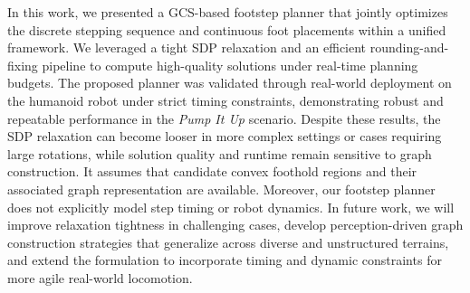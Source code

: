 \documentclass[letterpaper, 10 pt, journal, twoside]{IEEEtran}
\begin{document}
In this work, we presented a GCS-based footstep planner that jointly optimizes the discrete stepping sequence and continuous foot placements within a unified framework.
We leveraged a tight SDP relaxation and an efficient rounding-and-fixing pipeline to compute high-quality solutions under real-time planning budgets.
The proposed planner was validated through real-world deployment on the humanoid robot under strict timing constraints, demonstrating robust and repeatable performance in the \textit{Pump It Up} scenario.
Despite these results, the SDP relaxation can become looser in more complex settings or cases requiring large rotations, while solution quality and runtime remain sensitive to graph construction.
It assumes that candidate convex foothold regions and their associated graph representation are available. 
Moreover, our footstep planner does not explicitly model step timing or robot dynamics. 
In future work, we will improve relaxation tightness in challenging cases, develop perception-driven graph construction strategies that generalize across diverse and unstructured terrains, and extend the formulation to incorporate timing and dynamic constraints for more agile real-world locomotion.








\end{document}
